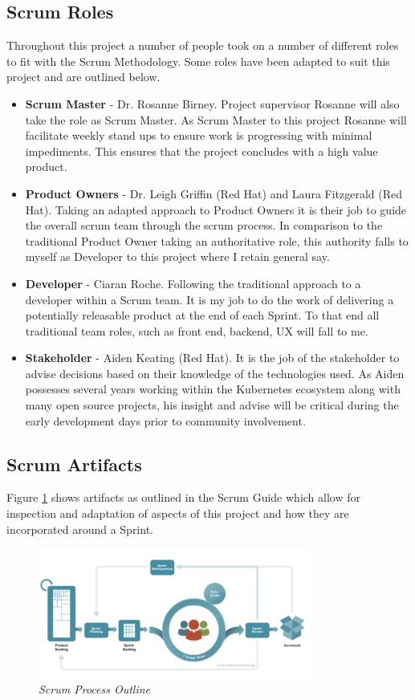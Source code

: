 \subsection{Scrum Roles}
Throughout this project a number of people took on a number of different roles to fit with the Scrum Methodology. Some roles have been adapted to suit this project and are outlined below.
\begin{itemize}
    \item \textbf{Scrum Master} - Dr. Rosanne Birney. Project supervisor Rosanne will also take the role as Scrum Master. As Scrum Master to this project Rosanne will facilitate weekly stand ups to ensure work is progressing with minimal impediments. This ensures that the project concludes with a high value product.
    \item \textbf{Product Owners} - Dr. Leigh Griffin (Red Hat) and Laura Fitzgerald (Red Hat). Taking an adapted approach to Product Owners it is their job to guide the overall scrum team through the scrum process. In comparison to the traditional Product Owner taking an authoritative role, this authority falls to myself as Developer to this project where I retain general say.
    \item \textbf{Developer} - Ciaran Roche. Following the traditional approach to a developer within a Scrum team. It is my job to do the work of delivering a potentially releasable product at the end of each Sprint. To that end all traditional team roles, such as front end, backend, UX will fall to me.
    \item \textbf{Stakeholder} - Aiden Keating (Red Hat). It is the job of the stakeholder to advise decisions based on their knowledge of the technologies used. As Aiden possesses several years working within the Kubernetes ecosystem along with many open source projects, his insight and advise will be critical during the early development days prior to community involvement.
\end{itemize}

\subsection{Scrum Artifacts}
\label{sub:sart}
Figure \ref{img:scrum} shows artifacts as outlined in the Scrum Guide \citep{scrum} which allow for inspection and adaptation of aspects of this project and how they are incorporated around a Sprint.
\begin{figure}[!ht]
\centering
\includegraphics*[width=0.8\textwidth]{images/scrum-process.png}
\caption{\em Scrum Process Outline \cite{scrumguide}}
\label{img:scrum}
\end{figure}

